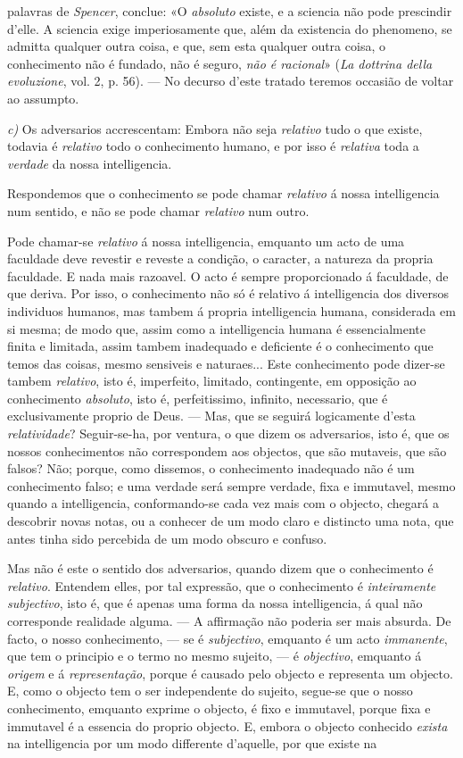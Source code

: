 palavras de \emph{Spencer}, conclue: «O \emph{absoluto} existe, e a sciencia não pode prescindir d'elle. A sciencia exige imperiosamente que, além da existencia do phenomeno, se admitta qualquer outra coisa, e que, sem esta qualquer outra coisa, o conhecimento não é fundado, não é seguro, \emph{não é racional}» (\emph{La dottrina della evoluzione}, vol. 2, p. 56). --- No decurso d'este tratado teremos occasião de voltar ao assumpto.\par \emph{c)} Os adversarios accrescentam: Embora não seja \emph{relativo} tudo o que existe, todavia é \emph{relativo} todo o conhecimento humano, e por isso é \emph{relativa} toda a \emph{verdade} da nossa intelligencia.\par Respondemos que o conhecimento se pode chamar \emph{relativo} á nossa intelligencia num sentido, e não se pode chamar \emph{relativo} num outro.\par Pode chamar-se \emph{relativo} á nossa intelligencia, emquanto um acto de uma faculdade deve revestir e reveste a condição, o caracter, a natureza da propria faculdade. E nada mais razoavel. O acto é sempre proporcionado á faculdade, de que deriva. Por isso, o conhecimento não só é relativo á intelligencia dos diversos individuos humanos, mas tambem á propria intelligencia humana, considerada em si mesma; de modo que, assim como a intelligencia humana é essencialmente finita e limitada, assim tambem inadequado e deficiente é o conhecimento que temos das coisas, mesmo sensiveis e naturaes... Este conhecimento pode dizer-se tambem \emph{relativo}, isto é, imperfeito, limitado, contingente, em opposição ao conhecimento \emph{absoluto}, isto é, perfeitissimo, infinito, necessario, que é exclusivamente proprio de Deus. --- Mas, que se seguirá logicamente d'esta \emph{relatividade}? Seguir-se-ha, por ventura, o que dizem os adversarios, isto é, que os nossos conhecimentos não correspondem aos objectos, que são mutaveis, que são falsos? Não; porque, como dissemos, o conhecimento inadequado não é um conhecimento falso; e uma verdade será sempre verdade, fixa e immutavel, mesmo quando a intelligencia, conformando-se cada vez mais com o objecto, chegará a descobrir novas notas, ou a conhecer de um modo claro e distincto uma nota, que antes tinha sido percebida de um modo obscuro e confuso.\par Mas não é este o sentido dos adversarios, quando dizem que o conhecimento é \emph{relativo}. Entendem elles, por tal expressão, que o conhecimento é \emph{inteiramente subjectivo}, isto é, que é apenas uma forma da nossa intelligencia, á qual não corresponde realidade alguma. --- A affirmação não poderia ser mais absurda. De facto, o nosso conhecimento, --- se é \emph{subjectivo}, emquanto é um acto \emph{immanente}, que tem o principio e o termo no mesmo sujeito, --- é \emph{objectivo}, emquanto á \emph{origem} e á \emph{representação}, porque é causado pelo objecto e representa um objecto. E, como o objecto tem o ser independente do sujeito, segue-se que o nosso conhecimento, emquanto exprime o objecto, é fixo e immutavel, porque fixa e immutavel é a essencia do proprio objecto. E, embora o objecto conhecido \emph{exista} na intelligencia por um modo differente d'aquelle, por que existe na 